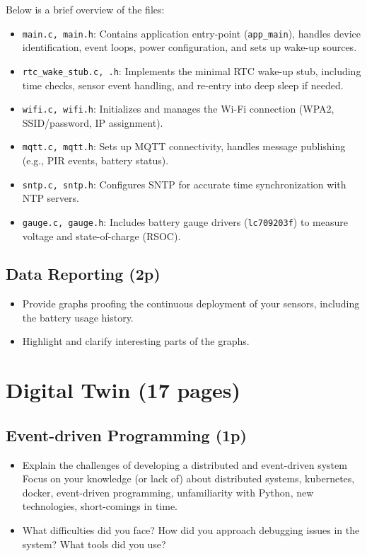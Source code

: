 \documentclass[A4,10pt]{article}
\begin{document}
\noindent Below is a brief overview of the files:
\begin{itemize}
    \item \texttt{main.c, main.h}: Contains application entry-point (\texttt{app\_main}), handles device identification, event loops, power configuration, and sets up wake-up sources.
    \item \texttt{rtc\_wake\_stub.c, .h}: Implements the minimal RTC wake-up stub, including time checks, sensor event handling, and re-entry into deep sleep if needed.
    \item \texttt{wifi.c, wifi.h}: Initializes and manages the Wi-Fi connection (WPA2, SSID/password, IP assignment).
    \item \texttt{mqtt.c, mqtt.h}: Sets up MQTT connectivity, handles message publishing (e.g., PIR events, battery status).
    \item \texttt{sntp.c, sntp.h}: Configures SNTP for accurate time synchronization with NTP servers.
    \item \texttt{gauge.c, gauge.h}: Includes battery gauge drivers (\texttt{lc709203f}) to measure voltage and state-of-charge (RSOC).
\end{itemize}

 
\subsection{Data Reporting (2p)}

\begin{itemize}
	\item Provide graphs proofing the continuous deployment of your sensors, including the battery usage history. 
	\item Highlight and clarify interesting parts of the graphs.
\end{itemize}


\section{Digital Twin (17 pages)}

\subsection{Event-driven Programming (1p)}

\begin{itemize}
	\item Explain the challenges of developing a distributed and event-driven system Focus on your knowledge (or lack of) about distributed systems, kubernetes, docker, event-driven programming, unfamiliarity with Python, new technologies, short-comings in time.
	\item What difficulties did you face? How did you approach debugging issues in the system? What tools did you use?
\end{itemize}
\end{document}
